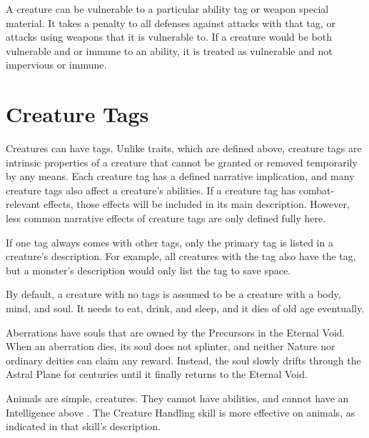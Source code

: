   A creature can be vulnerable to a particular ability tag or weapon special material.
  It takes a  penalty to all defenses against attacks with that tag, or attacks using weapons that it is vulnerable to.
  If a creature would be both vulnerable and \impervious or immune to an ability, it is treated as vulnerable and not impervious or immune.

\newpage
\section{Creature Tags}\label{Creature Tags}

  Creatures can have tags.
  Unlike traits, which are defined above, creature tags are intrinsic properties of a creature that cannot be granted or removed temporarily by any means.
  Each creature tag has a defined narrative implication, and many creature tags also affect a creature's abilities.
  If a creature tag has combat-relevant effects, those effects will be included in its main description.
  However, less common narrative effects of creature tags are only defined fully here.

  If one tag always comes with other tags, only the primary tag is listed in a creature's description.
  For example, all creatures with the  tag also have the  tag, but a monster's description would only list the  tag to save space.

  By default, a creature with no tags is assumed to be a  creature with a body, mind, and soul.
  It needs to eat, drink, and sleep, and it dies of old age eventually.

  Aberrations have souls that are owned by the Precursors in the Eternal Void.
  When an aberration dies, its soul does not splinter, and neither Nature nor ordinary deities can claim any reward.
  Instead, the soul slowly drifts through the Astral Plane for centuries until it finally returns to the Eternal Void.

  Animals are simple,  creatures.
  They cannot have \magical abilities, and cannot have an Intelligence above .
  The Creature Handling skill is more effective on animals, as indicated in that skill's description.

